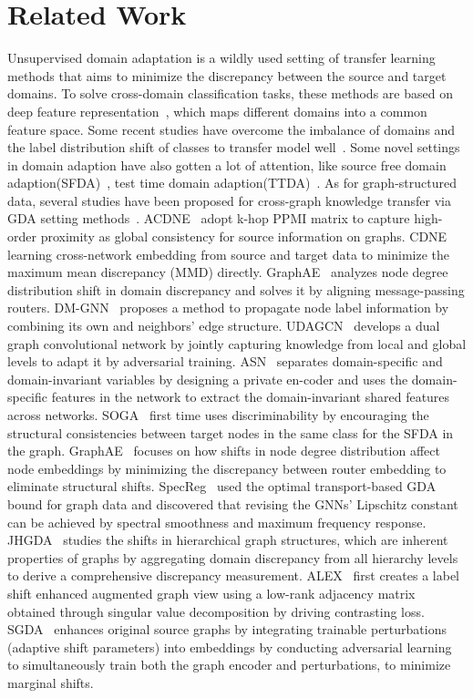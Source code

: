\section{Related Work}
Unsupervised domain adaptation is a wildly used setting of transfer learning methods that aims to minimize the discrepancy between the source and target domains. To solve cross-domain classification tasks, these methods are based on deep feature representation~\citep{zhu2022weakly,zengtowards}, which maps different domains into a common feature space. Some recent studies have overcome the imbalance of domains and the label distribution shift of classes to transfer model well~\citep{jing2021towards,xu2023class,pu2024leveraging,zeng2024latent}. Some novel settings in domain adaption have also gotten a lot of attention, like source free domain adaption(SFDA)~\citep{yang2021generalized, xu2025unraveling}, test time domain adaption(TTDA)~\citep{wang2022continual}.
As for graph-structured data, several studies have been proposed for cross-graph knowledge transfer via GDA setting methods~\citep{shen2019network,dai2022graph,shi2024graph}. ACDNE~\citep{shen2020adversarial} adopt k-hop PPMI matrix to capture high-order proximity as global consistency for source information on graphs. CDNE~\citep{shen2020network} learning cross-network embedding from source and target data to minimize the maximum mean discrepancy (MMD) directly. GraphAE~\citep{yan2020graphae} analyzes node degree distribution shift in domain discrepancy and solves it by aligning message-passing routers. DM-GNN~\citep{shen2023domain} proposes a method to propagate node label information by combining its own and neighbors’ edge structure. 
UDAGCN~\citep{wu2020unsupervised} develops a dual graph convolutional network by jointly capturing knowledge from local and global levels to adapt it by adversarial training. ASN~\citep{zhang2021adversarial} separates domain-specific and domain-invariant variables by designing a private en-coder and uses the domain-specific features in the network to extract the domain-invariant shared features across networks.  SOGA~\citep{mao2021source} first time uses discriminability by encouraging the structural consistencies between target nodes in the same class for the SFDA in the graph. GraphAE~\citep{guo2022learning} focuses on how shifts in node degree distribution affect node embeddings by minimizing the discrepancy between router embedding to eliminate structural shifts.
SpecReg~\citep{you2022graph} used the optimal transport-based GDA bound for graph data and discovered that revising the GNNs’ Lipschitz constant can be achieved by spectral smoothness and maximum frequency response.  JHGDA~\citep{shi2023improving} studies the shifts in hierarchical graph structures, which are inherent properties of graphs by aggregating domain discrepancy from all hierarchy levels to derive a comprehensive discrepancy measurement. ALEX~\citep{yuan2023alex} first creates a label shift enhanced augmented graph view using a low-rank adjacency matrix obtained through singular value decomposition by driving contrasting loss. SGDA~\citep{qiao2023semi} enhances original source graphs by integrating trainable perturbations (adaptive shift parameters) into embeddings by conducting adversarial learning to simultaneously train both the graph encoder and perturbations, to minimize marginal shifts.